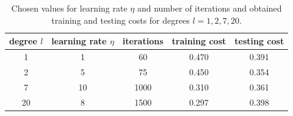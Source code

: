 \documentclass{article}
\begin{document}
\begin{table}[!ht]
\centering
\begin{tabular}{|c||c|c||c|c|}
\hline
degree $l$ & learning rate $\eta$ & iterations & training cost & testing cost \\ \hline \hline
1          & 1                    & 60         & 0.470         & 0.391        \\ \hline
2          & 5                    & 75         & 0.450         & 0.354        \\ \hline
7          & 10                   & 1000       & 0.310         & 0.361        \\ \hline
20         & 8                    & 1500       & 0.297         & 0.398        \\ \hline
\end{tabular}
\caption{Chosen values for learning rate $\eta$ and number of iterations and obtained training and testing costs for degrees $l=1,2,7,20$.}
\label{logreg4_tab}
\end{table}
\end{document}
